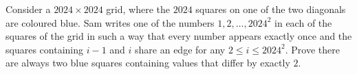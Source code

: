 Consider a $2024 \times 2024$ grid, where the $2024$ squares on one of the two diagonals are coloured blue.
Sam writes one of the numbers $1, 2, \dots, 2024^2$ in each of the squares of the grid in such a way that
every number appears exactly once and the squares containing $i-1$ and $i$ share an edge
for any $2 \le i \le 2024^2$. 
Prove there are always two blue squares containing values that differ by exactly $2$.
